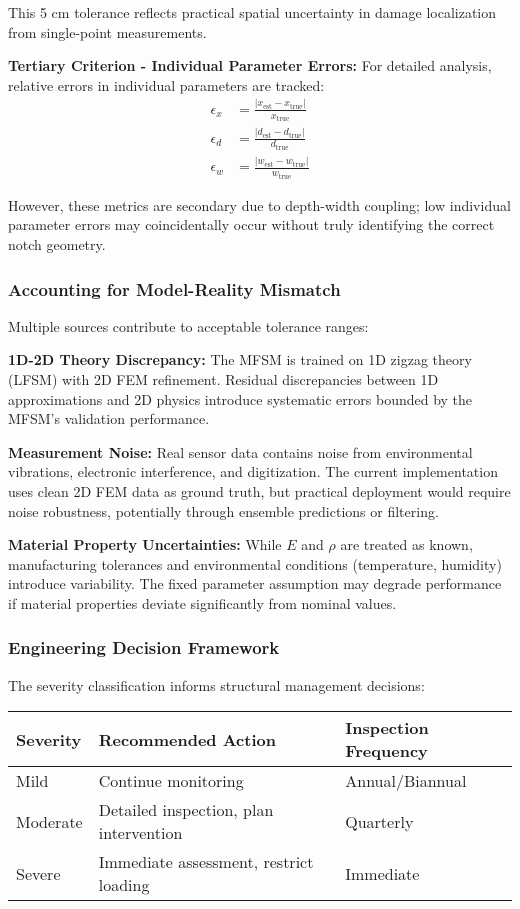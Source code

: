 \documentclass[12pt,a4paper]{report}
\begin{document}
This 5 cm tolerance reflects practical spatial uncertainty in damage localization from single-point measurements.

\textbf{Tertiary Criterion - Individual Parameter Errors:}
For detailed analysis, relative errors in individual parameters are tracked:
\begin{align}
\epsilon_{x} &= \frac{|x_{\text{est}} - x_{\text{true}}|}{x_{\text{true}}} \\
\epsilon_{d} &= \frac{|d_{\text{est}} - d_{\text{true}}|}{d_{\text{true}}} \\
\epsilon_{w} &= \frac{|w_{\text{est}} - w_{\text{true}}|}{w_{\text{true}}}
\end{align}

However, these metrics are secondary due to depth-width coupling; low individual parameter errors may coincidentally occur without truly identifying the correct notch geometry.

\subsubsection{Accounting for Model-Reality Mismatch}
Multiple sources contribute to acceptable tolerance ranges:

\textbf{1D-2D Theory Discrepancy:} The MFSM is trained on 1D zigzag theory (LFSM) with 2D FEM refinement. Residual discrepancies between 1D approximations and 2D physics introduce systematic errors bounded by the MFSM's validation performance.

\textbf{Measurement Noise:} Real sensor data contains noise from environmental vibrations, electronic interference, and digitization. The current implementation uses clean 2D FEM data as ground truth, but practical deployment would require noise robustness, potentially through ensemble predictions or filtering.

\textbf{Material Property Uncertainties:} While $E$ and $\rho$ are treated as known, manufacturing tolerances and environmental conditions (temperature, humidity) introduce variability. The fixed parameter assumption may degrade performance if material properties deviate significantly from nominal values.

\subsubsection{Engineering Decision Framework}
The severity classification informs structural management decisions:

\begin{center}
\begin{tabular}{|l|l|l|}
\hline
\textbf{Severity} & \textbf{Recommended Action} & \textbf{Inspection Frequency} \\
\hline
Mild & Continue monitoring & Annual/Biannual \\
Moderate & Detailed inspection, plan intervention & Quarterly \\
Severe & Immediate assessment, restrict loading & Immediate \\
\hline
\end{tabular}
\end{center}
\end{document}
